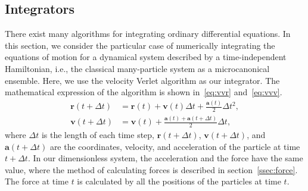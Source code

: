 \subsection{Integrators}

There exist many algorithms for integrating ordinary differential equations.
In this section, we consider the particular case of numerically integrating the equations of
motion for a dynamical system described by a time-independent Hamiltonian, i.e., the
classical many-particle system as a microcanonical ensemble.
Here, we use the velocity Verlet algorithm as our integrator.
The mathematical expression of the algorithm is shown in~\eqref{eq:vvr} and~\eqref{eq:vvv}.
%
\begin{align}
    \bm{r}(t + \Delta t) & = \bm{r}(t) + \bm{v}(t) \Delta t + \frac{ \bm{a}(t) }{ 2 } \Delta t^2,\label{eq:vvr} \\
    \bm{v}(t + \Delta t) & = \bm{v}(t) + \frac{ \bm{a}(t) + \bm{a}(t + \Delta t) }{ 2 } \Delta t,\label{eq:vvv}
\end{align}
%
where \(\Delta t\) is the length of each time step, \(\bm{r}(t + \Delta t)\),
\(\bm{v}(t + \Delta t)\), and \(\bm{a}(t + \Delta t)\)
are the coordinates, velocity, and acceleration of the particle at time \(t + \Delta t\).
In our dimensionless system, the acceleration and the force have the same value,
where the method of calculating forces is described in section~\ref{ssec:force}.
The force at time \(t\) is calculated by all the positions of the particles at time \(t\).

